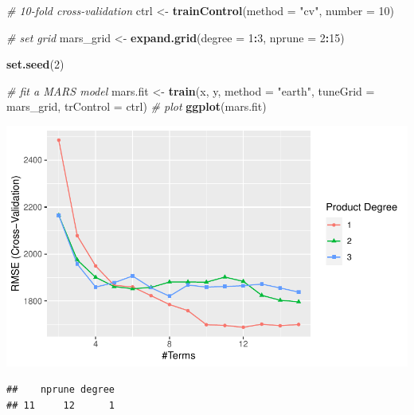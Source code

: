 \documentclass[
]{article}
\newenvironment{Shaded}{\begin{snugshade}}{\end{snugshade}}
\newcommand{\AttributeTok}[1]{\textcolor[rgb]{0.13,0.29,0.53}{#1}}
\newcommand{\CommentTok}[1]{\textcolor[rgb]{0.56,0.35,0.01}{\textit{#1}}}
\newcommand{\DecValTok}[1]{\textcolor[rgb]{0.00,0.00,0.81}{#1}}
\newcommand{\FunctionTok}[1]{\textcolor[rgb]{0.13,0.29,0.53}{\textbf{#1}}}
\newcommand{\NormalTok}[1]{#1}
\newcommand{\OtherTok}[1]{\textcolor[rgb]{0.56,0.35,0.01}{#1}}
\newcommand{\SpecialCharTok}[1]{\textcolor[rgb]{0.81,0.36,0.00}{\textbf{#1}}}
\newcommand{\StringTok}[1]{\textcolor[rgb]{0.31,0.60,0.02}{#1}}
\begin{document}
\begin{Shaded}
\begin{Highlighting}[]
\CommentTok{\# 10{-}fold cross{-}validation}
\NormalTok{ctrl }\OtherTok{\textless{}{-}} \FunctionTok{trainControl}\NormalTok{(}\AttributeTok{method =} \StringTok{"cv"}\NormalTok{, }\AttributeTok{number =} \DecValTok{10}\NormalTok{)}

\CommentTok{\# set grid}
\NormalTok{mars\_grid }\OtherTok{\textless{}{-}} \FunctionTok{expand.grid}\NormalTok{(}\AttributeTok{degree =} \DecValTok{1}\SpecialCharTok{:}\DecValTok{3}\NormalTok{, }\AttributeTok{nprune =} \DecValTok{2}\SpecialCharTok{:}\DecValTok{15}\NormalTok{)}

\FunctionTok{set.seed}\NormalTok{(}\DecValTok{2}\NormalTok{)}

\CommentTok{\# fit a MARS model}
\NormalTok{mars.fit }\OtherTok{\textless{}{-}} \FunctionTok{train}\NormalTok{(x, y,}
                  \AttributeTok{method =} \StringTok{"earth"}\NormalTok{,}
                  \AttributeTok{tuneGrid =}\NormalTok{ mars\_grid,}
                  \AttributeTok{trControl =}\NormalTok{ ctrl)}
\CommentTok{\# plot}
\FunctionTok{ggplot}\NormalTok{(mars.fit)}
\end{Highlighting}
\end{Shaded}

\includegraphics[width=0.9\linewidth]{HW2_co2554_files/figure-latex/MARS-1}

\begin{Shaded}
\end{Shaded}

\begin{verbatim}
##    nprune degree
## 11     12      1
\end{verbatim}
\end{document}
